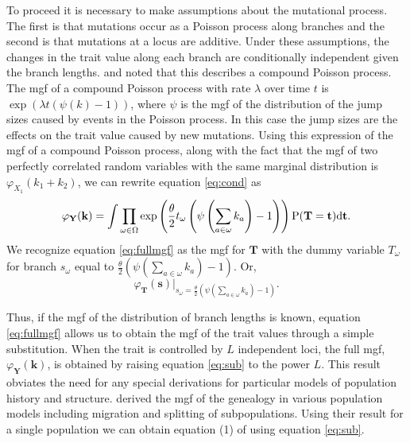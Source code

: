 To proceed it is necessary to make assumptions about the mutational process. The
first is that mutations occur as a Poisson process along branches and the second
is that mutations at a locus are additive. Under these assumptions, the changes
in the trait value along each branch are conditionally independent given the
branch lengths. \citet{Khaitovich2005} and \citet{Schraiber2015} noted that this
describes a compound Poisson process. The mgf of a compound Poisson process with
rate $\lambda$ over time $t$ is $\exp(\lambda t (\psi(k)-1))$, where $\psi$ is
the mgf of the distribution of the jump sizes caused by events in the Poisson
process. In this case the jump sizes are the effects on the trait value caused
by new mutations. Using this expression of the mgf of a compound Poisson
process, along with the fact that the mgf of two perfectly correlated random
variables with the same marginal distribution is $\varphi_{X_1}(k_1+k_2)$, we
can rewrite equation \eqref{eq:cond} as
\begin{equation}
  \label{eq:fullmgf}
  \varphi_{\mathbf{Y}}(\mathbf{k}) = 
  \int \prod_{\omega \in \Omega} \exp\left( \frac{\theta}{2} t_{\omega} \left( \psi\left(\sum_{a \in \omega}k_{a}\right) -1 \right)\right)
  \mathrm{P}(\mathbf{T}=\mathbf{t})\mbox{d}\mathbf{t}.
\end{equation}
We recognize equation \eqref{eq:fullmgf} as the mgf for $\mathbf{T}$ with the
dummy variable $T_{\omega}$ for branch $s_\omega$ equal to
$\frac{\theta}{2} \left( \psi(\sum_{a \in \omega}k_{a}) -1 \right)$. Or,
\begin{equation}
  \label{eq:sub}
  \varphi_{\mathbf{T}}(\mathbf{s})\Bigr|_{s_{\omega}=\frac{\theta}{2} \left( \psi\left(\sum_{a \in \omega}k_{a}\right) -1 \right)}.
\end{equation}

Thus, if the mgf of the distribution of branch lengths is known, equation
\eqref{eq:fullmgf} allows us to obtain the mgf of the trait values through a
simple substitution. When the trait is controlled by $L$ independent loci, the
full mgf, $\varphi_{\mathbf{Y}}(\mathbf{k})$, is obtained by raising
equation \eqref{eq:sub} to the power $L$. This result obviates the need for any
special derivations for particular models of population history and structure.
\citet{Lohse2011} derived the mgf of the genealogy in various population models
including migration and splitting of subpopulations. Using their result for a
single population we can obtain equation (1) of \citet{Schraiber2015} using
equation \eqref{eq:sub}. 

